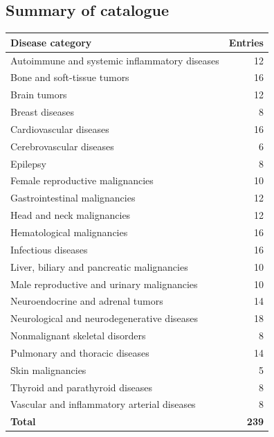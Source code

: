 \subsection{Summary of catalogue}
\begin{center}
\begin{tabular}{@{}p{}r@{}}
\toprule
\textbf{Disease category} & \textbf{Entries} \\
\midrule
Autoimmune and systemic inflammatory diseases & 12 \\
Bone and soft-tissue tumors & 16 \\
Brain tumors & 12 \\
Breast diseases & 8 \\
Cardiovascular diseases & 16 \\
Cerebrovascular diseases & 6 \\
Epilepsy & 8 \\
Female reproductive malignancies & 10 \\
Gastrointestinal malignancies & 12 \\
Head and neck malignancies & 12 \\
Hematological malignancies & 16 \\
Infectious diseases & 16 \\
Liver, biliary and pancreatic malignancies & 10 \\
Male reproductive and urinary malignancies & 10 \\
Neuroendocrine and adrenal tumors & 14 \\
Neurological and neurodegenerative diseases & 18 \\
Nonmalignant skeletal disorders & 8 \\
Pulmonary and thoracic diseases & 14 \\
Skin malignancies & 5 \\
Thyroid and parathyroid diseases & 8 \\
Vascular and inflammatory arterial diseases & 8 \\
\midrule
\textbf{Total} & \textbf{239} \\
\bottomrule
\end{tabular}
\end{center}

